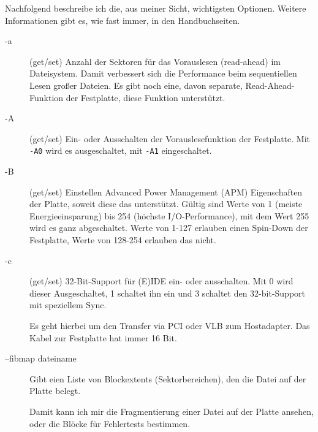 \begin{normaltext}
  Nachfolgend beschreibe ich die, aus meiner Sicht, wichtigsten Optionen.
  Weitere Informationen gibt es, wie fast immer, in den Handbuchseiten.
  \begin{description}
    \item[-a] (get/set) Anzahl der Sektoren für das Vorauslesen (read-ahead)
      im Dateisystem. Damit verbessert sich die Performance beim sequentiellen
      Lesen großer Dateien. Es gibt noch eine, davon separate,
      Read-Ahead-Funktion der Festplatte, diese Funktion unterstützt.
    \item[-A] (get/set) Ein- oder Ausschalten der Vorauslesefunktion der
      Festplatte. Mit \verb?-A0? wird es ausgeschaltet, mit \verb?-A1?
      eingeschaltet.
    \item[-B] (get/set) Einstellen Advanced Power Management (APM)
      Eigenschaften der Platte, soweit diese das unterstützt. Gültig sind
      Werte von 1 (meiste Energieeinsparung) bis 254 (höchste
      I/O-Performance), mit dem Wert 255 wird es ganz abgeschaltet. Werte von
      1-127 erlauben einen Spin-Down der Festplatte, Werte von 128-254
      erlauben das nicht.
    \item[-c] (get/set) 32-Bit-Support für (E)IDE ein- oder ausschalten.
      Mit 0 wird dieser Ausgeschaltet, 1 schaltet ihn ein und 3 schaltet den
      32-bit-Support mit speziellem Sync.

      Es geht hierbei um den Transfer via PCI oder VLB zum Hostadapter. Das
      Kabel zur Festplatte hat immer 16 Bit.
    \item[--fibmap dateiname] Gibt eien Liste von Blockextents
      (Sektorbereichen), den die Datei auf der Platte belegt.

      Damit kann ich mir die Fragmentierung einer Datei auf der Platte
      ansehen, oder die Blöcke für Fehlertests bestimmen.


\end{description}
\end{normaltext}
